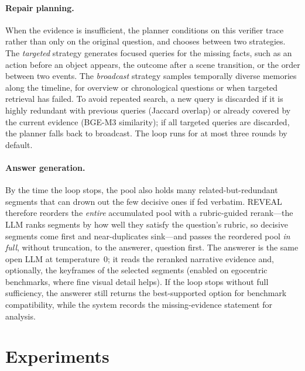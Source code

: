 \documentclass[letterpaper]{article} %
\begin{document}
\paragraph{Repair planning.}
When the evidence is insufficient, the planner conditions on this verifier trace rather than only on the original question, and chooses between two strategies. The \textit{targeted} strategy generates focused queries for the missing facts, such as an action before an object appears, the outcome after a scene transition, or the order between two events. The \textit{broadcast} strategy samples temporally diverse memories along the timeline, for overview or chronological questions or when targeted retrieval has failed. To avoid repeated search, a new query is discarded if it is highly redundant with previous queries (Jaccard overlap) or already covered by the current evidence (BGE-M3 similarity); if all targeted queries are discarded, the planner falls back to broadcast. The loop runs for at most three rounds by default.

\paragraph{Answer generation.}
By the time the loop stops, the pool also holds many related-but-redundant segments that can drown out the few decisive ones if fed verbatim. REVEAL therefore reorders the \emph{entire} accumulated pool with a rubric-guided rerank---the LLM ranks segments by how well they satisfy the question's rubric, so decisive segments come first and near-duplicates sink---and passes the reordered pool \emph{in full}, without truncation, to the answerer, question first. The answerer is the same open LLM at temperature~0; it reads the reranked narrative evidence and, optionally, the keyframes of the selected segments (enabled on egocentric benchmarks, where fine visual detail helps). If the loop stops without full sufficiency, the answerer still returns the best-supported option for benchmark compatibility, while the system records the missing-evidence statement for analysis.

\section{Experiments}
\end{document}
